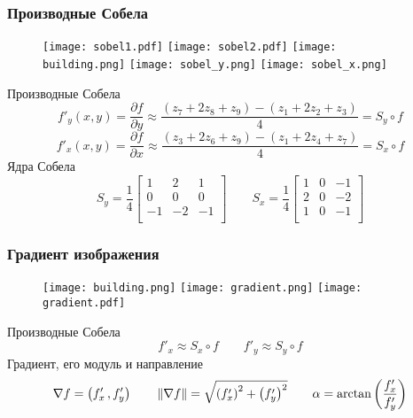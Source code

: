 \documentclass[
    12pt, 
    usepdftitle=false,
    aspectratio=1610
]{beamer}
\DeclarePairedDelimiter{\norm}{\lVert}{\rVert}
\begin{document}
\begin{frame}
\frametitle{Производные Собела}
\begin{figure}
    \centering
    \texttt{[image: sobel1.pdf]}
    \hspace*{0.5cm}
    \texttt{[image: sobel2.pdf]}
    \hspace*{0.5cm}
    \texttt{[image: building.png]}
    \hspace*{0.5cm}
    \texttt{[image: sobel\_y.png]}
    \hspace*{0.5cm}
    \texttt{[image: sobel\_x.png]}
\end{figure}
Производные Собела
$$
    f'_y(x,y)=\frac{\partial f}{\partial y}\approx
    \frac{(z_7+2z_8+z_9)-(z_1+2z_2+z_3)}{4}=S_y\circ f
$$
$$
    f'_x(x,y)=\frac{\partial f}{\partial x}\approx
    \frac{(z_3+2z_6+z_9)-(z_1+2z_4+z_7)}{4}=S_x\circ f
$$
Ядра Собела
$$
    S_y=
    \frac{1}{4}
    \begin{bmatrix}
        1 & 2 & 1 \\
        0 & 0 & 0 \\
        -1 & -2 & -1 \\
    \end{bmatrix}
    \qquad
    S_x=\frac{1}{4}
    \begin{bmatrix}
        1 & 0 & -1 \\
        2 & 0 & -2 \\
        1 & 0 & -1 \\
    \end{bmatrix}
$$
\end{frame}

\begin{frame}
\frametitle{Градиент изображения}
\begin{figure}
    \centering
    \texttt{[image: building.png]}
    \hspace*{0.5cm}
    \texttt{[image: gradient.png]}
    \hspace*{0.5cm}
    \texttt{[image: gradient.pdf]}
\end{figure}
Производные Собела
$$
    f'_x\approx S_x\circ f\qquad
    f'_y\approx S_y\circ f
$$
Градиент, его модуль и направление 
$$
    \nabla f = \left(f'_x\,, f'_y\right)\qquad
    \norm{\nabla f}=\sqrt{\left(f'_x\right)^2+\left(f'_y\right)^2}\qquad
    \alpha=\arctan\left(\frac{f'_x}{f'_y}\right)
$$
\end{frame}
\end{document}
